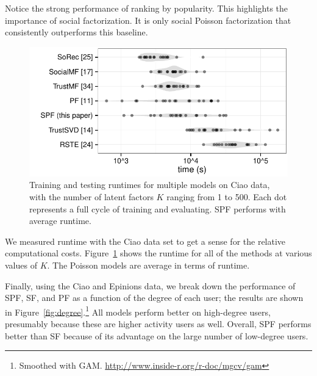 \documentclass{sig-alternate-2013}
\begin{document}
Notice the strong performance of ranking by popularity.  This
highlights the importance of social factorization.  It is only social
Poisson factorization that consistently outperforms this baseline.

\begin{figure}[ht]
\hspace{-10px}
\includegraphics[width=\columnwidth]{../fig/runtimes.pdf}
\caption{Training and testing runtimes for multiple models on Ciao data, with the number of latent factors $K$ ranging from 1 to 500.  Each dot represents a full cycle of training and evaluating.  SPF performs with average runtime.}\label{fig:runtime}
\end{figure}

We measured runtime with the Ciao data set to get a sense for the
relative computational costs.  Figure~\ref{fig:runtime} shows the
runtime for all of the methods at various values of $K$.  The Poisson
models are average in terms of runtime.

Finally, using the Ciao and Epinions data, we break down the
performance of SPF, SF, and PF as a function of the degree of each
user; the results are shown in Figure~\ref{fig:degree}.\footnote{Smoothed with GAM. \url{http://www.inside-r.org/r-doc/mgcv/gam}}
All models perform better on high-degree users, presumably
because these are higher activity users as well. Overall, SPF performs
better than SF because of its advantage on the large number of
low-degree users.
\end{document}
